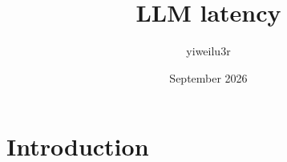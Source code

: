 \documentclass{article}
\title{LLM latency}
\author{yiweilu3r }
\date{September 2026}
\begin{document}
\maketitle

\section{Introduction}
\end{document}
